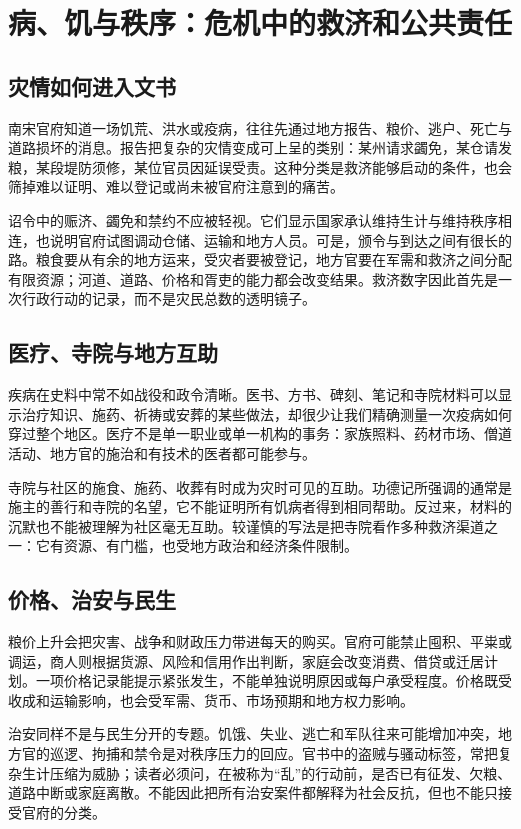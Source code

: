 \section{病、饥与秩序：危机中的救济和公共责任}

\subsection{灾情如何进入文书}

南宋官府知道一场饥荒、洪水或疫病，往往先通过地方报告、粮价、逃户、死亡与道路损坏的消息。报告把复杂的灾情变成可上呈的类别：某州请求蠲免，某仓请发粮，某段堤防须修，某位官员因延误受责。这种分类是救济能够启动的条件，也会筛掉难以证明、难以登记或尚未被官府注意到的痛苦。

诏令中的赈济、蠲免和禁约不应被轻视。它们显示国家承认维持生计与维持秩序相连，也说明官府试图调动仓储、运输和地方人员。可是，颁令与到达之间有很长的路。粮食要从有余的地方运来，受灾者要被登记，地方官要在军需和救济之间分配有限资源；河道、道路、价格和胥吏的能力都会改变结果。救济数字因此首先是一次行政行动的记录，而不是灾民总数的透明镜子。

\subsection{医疗、寺院与地方互助}

疾病在史料中常不如战役和政令清晰。医书、方书、碑刻、笔记和寺院材料可以显示治疗知识、施药、祈祷或安葬的某些做法，却很少让我们精确测量一次疫病如何穿过整个地区。医疗不是单一职业或单一机构的事务：家族照料、药材市场、僧道活动、地方官的施治和有技术的医者都可能参与。

寺院与社区的施食、施药、收葬有时成为灾时可见的互助。功德记所强调的通常是施主的善行和寺院的名望，它不能证明所有饥病者得到相同帮助。反过来，材料的沉默也不能被理解为社区毫无互助。较谨慎的写法是把寺院看作多种救济渠道之一：它有资源、有门槛，也受地方政治和经济条件限制。

\subsection{价格、治安与民生}

粮价上升会把灾害、战争和财政压力带进每天的购买。官府可能禁止囤积、平粜或调运，商人则根据货源、风险和信用作出判断，家庭会改变消费、借贷或迁居计划。一项价格记录能提示紧张发生，不能单独说明原因或每户承受程度。价格既受收成和运输影响，也会受军需、货币、市场预期和地方权力影响。

治安同样不是与民生分开的专题。饥饿、失业、逃亡和军队往来可能增加冲突，地方官的巡逻、拘捕和禁令是对秩序压力的回应。官书中的盗贼与骚动标签，常把复杂生计压缩为威胁；读者必须问，在被称为“乱”的行动前，是否已有征发、欠粮、道路中断或家庭离散。不能因此把所有治安案件都解释为社会反抗，但也不能只接受官府的分类。

